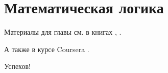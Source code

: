 \chapter{Математическая логика}

Материалы для главы см. в книгах \cite{galiev2002}, \cite{kolmogorov2006}.

А также в курсе Coursera \cite{coursera-logic}.

Успехов!
